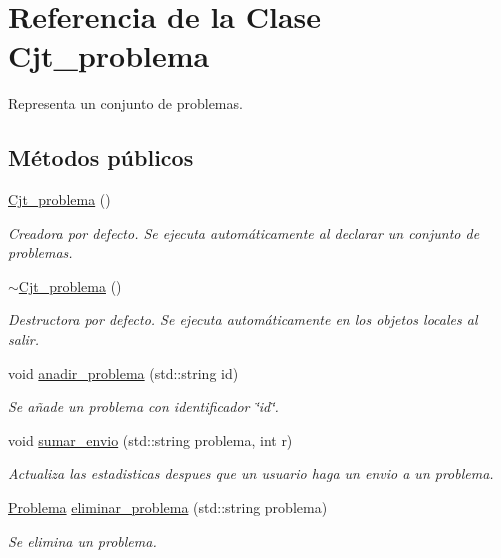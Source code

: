 \hypertarget{class_cjt__problema}{}\section{Referencia de la Clase Cjt\+\_\+problema}
\label{class_cjt__problema}


Representa un conjunto de problemas.  


\subsection*{Métodos públicos}
\begin{DoxyCompactItemize}
\item 
\mbox{\hyperlink{class_cjt__problema_ae278b02c810f660bdbe970841ca8f166}{Cjt\+\_\+problema}} ()
\begin{DoxyCompactList}\small\item\em Creadora por defecto. Se ejecuta automáticamente al declarar un conjunto de problemas. \end{DoxyCompactList}\item 
\mbox{\hyperlink{class_cjt__problema_a8332d80bb4600f2c9d8da0ed68c87010}{$\sim$\+Cjt\+\_\+problema}} ()
\begin{DoxyCompactList}\small\item\em Destructora por defecto. Se ejecuta automáticamente en los objetos locales al salir. \end{DoxyCompactList}\item 
void \mbox{\hyperlink{class_cjt__problema_a6086147f5615c1cf42d6d563682b080d}{anadir\+\_\+problema}} (std\+::string id)
\begin{DoxyCompactList}\small\item\em Se añade un problema con identificador \char`\"{}id\char`\"{}. \end{DoxyCompactList}\item 
void \mbox{\hyperlink{class_cjt__problema_a5450799b75298f2b267f3ecce7ba5fb0}{sumar\+\_\+envio}} (std\+::string problema, int r)
\begin{DoxyCompactList}\small\item\em Actualiza las estadisticas despues que un usuario haga un envio a un problema. \end{DoxyCompactList}\item 
\mbox{\hyperlink{class_problema}{Problema}} \mbox{\hyperlink{class_cjt__problema_afa2668b9e1a1bc710c29f19512399c58}{eliminar\+\_\+problema}} (std\+::string problema)
\begin{DoxyCompactList}\small\item\em Se elimina un problema. \end{DoxyCompactList}\item 

\end{DoxyCompactItemize}
